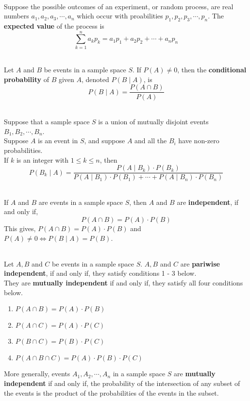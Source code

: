 \documentclass[12pt]{article}
\begin{document}
\begin{definition}
\hfill\\
\normalfont Suppose the possible outcomes of an experiment, or random process, are real numbers $a_1, a_2, a_3,\cdots,a_n$ which occur with proabilities $p_1,p_2,p_3,\cdots,p_n$. The \textbf{expected value} of the process is
\[
\sum^n_{k=1}a_k p_k = a_1p_1+a_2p_2+\cdots+a_np_n
\]
\end{definition}
\begin{definition}
\hfill\\
\normalfont Let $A$ and $B$ be events in a sample space $S$. If $P(A)\neq 0$, then the \textbf{conditional probability} of $B$ given $A$, denoted $P(B\mid A)$, is
\[
P(B\mid A)= \frac{P(A\cap B)}{P(A)}
\]
\end{definition}
\begin{definition}
\hfill\\
\normalfont Suppose that a sample space $S$ is a union of mutually disjoint events $B_1, B_2, \cdots, B_n$. \\
Suppose $A$ is an event in $S$, and suppose $A$ and all the $B_i$ have non-zero probabilities. \\
If $k$ is an integer with $1\leq k\leq n$, then
\[
P(B_k\mid A)=\frac{P(A\mid B_k)\cdot P(B_k)}{P(A\mid B_1)\cdot P(B_1)+\cdots+P(A\mid B_n)\cdot P(B_n)}
\]
\end{definition}
\begin{definition}
\hfill\\
\normalfont If $A$ and $B$ are events in a sample space $S$, then $A$ and $B$ are \textbf{independent}, if and only if, 
\[
P(A\cap B)=P(A)\cdot P(B)
\]
This gives, $P(A\cap B)=P(A)\cdot P(B)$ and $P(A)\neq 0\Leftrightarrow P(B\mid A)=P(B)$.
\end{definition}
\begin{definition}
\hfill\\
\normalfont Let $A, B$ and $C$ be events in a sample space $S$. $A, B$ and $C$ are \textbf{pariwise independent}, if and only if, they satisfy conditions 1 - 3 below. \\
They are \textbf{mutually independent} if and only if, they satisfy all four conditions below.
\begin{enumerate}
\item $P(A\cap B)=P(A)\cdot P(B)$
\item $P(A\cap C)=P(A)\cdot P(C)$
\item $P(B\cap C)=P(B)\cdot P(C)$
\item $P(A\cap B\cap C)=P(A)\cdot P(B)\cdot P(C)$
\end{enumerate}
More generally, events $A_1,A_2,\cdots,A_n$ in a sample space $S$ are \textbf{mutually independent} if and only if, the probability of the intersection of any subset of the events is the product of the probabilities of the events in the subset.
\end{definition}
\clearpage
\end{document}
